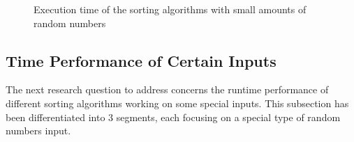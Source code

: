 \documentclass{report}
\begin{document}
\begin{figure}
	\caption{Execution time of the sorting algorithms with small amounts of random numbers}
	\label{smallFig}
\end{figure}

\subsection{Time Performance of Certain Inputs}
The next research question to address concerns the runtime performance of different sorting algorithms working on some special inputs. This subsection has been differentiated into 3 segments, each focusing on a special type of random numbers input.
\end{document}
